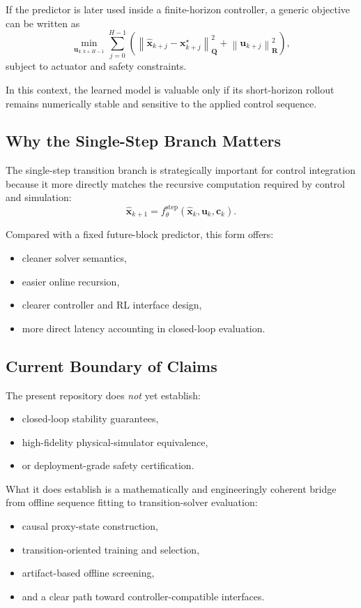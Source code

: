 If the predictor is later used inside a finite-horizon controller, a generic objective can be written as
\begin{equation}
\min_{\mathbf{u}_{k:k+H-1}}
\sum_{j=0}^{H-1}
\left(
\left\|
\hat{\mathbf{x}}_{k+j} - \mathbf{x}^{\star}_{k+j}
\right\|_{\mathbf{Q}}^{2}
+
\left\|
\mathbf{u}_{k+j}
\right\|_{\mathbf{R}}^{2}
\right),
\end{equation}
subject to actuator and safety constraints.

In this context, the learned model is valuable only if its short-horizon rollout remains numerically stable and sensitive to the applied control sequence.

\subsection{Why the Single-Step Branch Matters}

The single-step transition branch is strategically important for control integration because it more directly matches the recursive computation required by control and simulation:
\begin{equation}
\hat{\mathbf{x}}_{k+1}
=
f_{\theta}^{\mathrm{step}}\!\left(\hat{\mathbf{x}}_{k}, \mathbf{u}_{k}, \mathbf{c}_{k}\right).
\end{equation}

Compared with a fixed future-block predictor, this form offers:
\begin{itemize}
  \item cleaner solver semantics,
  \item easier online recursion,
  \item clearer controller and RL interface design,
  \item more direct latency accounting in closed-loop evaluation.
\end{itemize}

\subsection{Current Boundary of Claims}

The present repository does \emph{not} yet establish:
\begin{itemize}
  \item closed-loop stability guarantees,
  \item high-fidelity physical-simulator equivalence,
  \item or deployment-grade safety certification.
\end{itemize}

What it does establish is a mathematically and engineeringly coherent bridge from offline sequence fitting to transition-solver evaluation:
\begin{itemize}
  \item causal proxy-state construction,
  \item transition-oriented training and selection,
  \item artifact-based offline screening,
  \item and a clear path toward controller-compatible interfaces.
\end{itemize}
